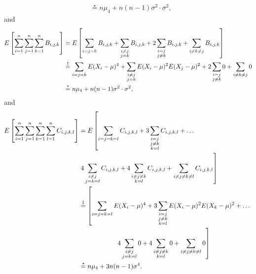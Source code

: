 \documentclass{homework}
\begin{document}
\begin{solution}
\begin{align*}
    &\stackrel{\star}{=} n\mu_4 + n(n-1)\sigma^2\cdot\sigma^2,
  \end{align*}
  and
  \begin{align*}
    E\left[\sum_{i=1}^n\sum_{j=1}^n\sum_{k=1}^n B_{i,j,k}\right]
    &=E\left[\sum_{i=j=k} B_{i,j,k} + \sum_{\substack{i\not= j\\j=k}} B_{i,j,k} + 2\sum_{\substack{i=j \\ j\not=k}} B_{i,j,k} + \sum_{i\not=k\not=j}B_{i,j,k}\right] \\
    &\stackrel{\dagger}{=}\sum_{i=j=k} E(X_i-\mu)^4 + \sum_{\substack{i\not= j\\j=k}} E(X_i-\mu)^2E(X_j-\mu)^2 + 2\sum_{\substack{i=j \\ j\not=k}} 0 + \sum_{i\not=k\not=j} 0 \\
    &\stackrel{\star}{=} n\mu_4 + n(n-1)\sigma^2\cdot\sigma^2,
  \end{align*}
  and
  \begin{align*}
    E\left[\ssssum C_{i,j,k,l}\right]
    &=E\left[
    \sum_{i=j=k=l} C_{i,j,k,l} + 
    3\sum_{\substack{i=j\\j\not=k\\k=l}} C_{i,j,k,l} +\dots
    \right.\\
    &\left.
    4 \sum_{\substack{i\not=j\\j=k=l}} C_{i,j,k,l} +
    4 \sum_{\substack{i\not=j\not=k\\k=l}} C_{i,j,k,l} +
     \sum_{\substack{i\not=j\not=k\not=l}} C_{i,j,k,l}   
    \right]\\
    &\stackrel{\ddagger}{=}\left[
    \sum_{i=j=k=l} E(X_i-\mu)^4 + 
    3\sum_{\substack{i=j\\j\not=k\\k=l}} E(X_i-\mu)^2E(X_k-\mu)^2 +\dots \right.
    \\
    &\left.
    \hspace{2cm}4 \sum_{\substack{i\not=j\\j=k=l}} 0 +
    4 \sum_{\substack{i\not=j\not=k\\k=l}} 0 +
     \sum_{\substack{i\not=j\not=k\not=l}} 0 \right] \\
    &\stackrel{\star}{=}n \mu_4 + 3n(n-1)\sigma^4.

\end{align*}
\end{solution}
\end{document}
